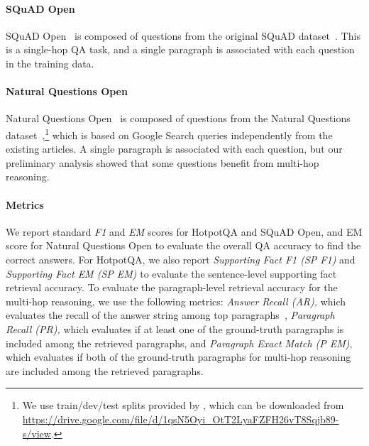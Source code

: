 \documentclass{article} \usepackage{iclr2020_conference,times}
\begin{document}
\vspace{-2mm}\paragraph{SQuAD Open}
SQuAD Open~\citep{chen2017reading} is composed of questions from the original SQuAD dataset~\citep{rajpurkar2016squad}. 
This is a single-hop QA task, and a single paragraph is associated with each question in the training data.

\vspace{-2mm}\paragraph{Natural Questions Open}
Natural Questions Open~\citep{lee-chang-toutanova:2019:ACL2019} is composed of questions from the Natural Questions dataset~\citep{kwiatkowski2019natural},\footnote{We use train/dev/test splits provided by \cite{min2019discrete}, which can be downloaded from \url{https://drive.google.com/file/d/1qsN5Oyi_OtT2LyaFZFH26vT8Sqjb89-s/view}.} which is based on Google Search queries independently from the existing articles.
A single paragraph is associated with each question, but our preliminary analysis showed that some questions benefit from multi-hop reasoning.

\vspace{-2mm}\paragraph{Metrics} 
We report standard {\it F1} and {\it EM} scores for HotpotQA and SQuAD Open, and EM score for Natural Questions Open to evaluate the overall QA accuracy to find the correct answers. For HotpotQA, we also report {\it Supporting Fact F1 (SP F1)} and {\it Supporting Fact EM (SP EM)} to evaluate the sentence-level supporting fact retrieval accuracy.
To evaluate the paragraph-level retrieval accuracy for the multi-hop reasoning, we use the following metrics: {\it Answer Recall (AR),} which evaluates the recall of the answer string among top paragraphs~\citep{wang2018r,das2019multi}, 
{\it Paragraph Recall (PR),} which evaluates 
if at least one of the ground-truth paragraphs is included among the retrieved paragraphs, and 
{\it Paragraph Exact Match (P EM)},
which evaluates if both of the ground-truth paragraphs for multi-hop reasoning are included among the retrieved paragraphs.
\end{document}
